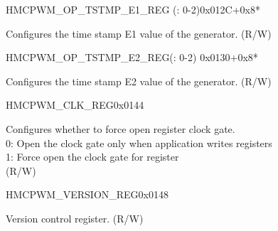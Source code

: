 \begin{register}{H}{MCPWM\_OP\_TSTMP\_E1\_REG (: 0-2)}{0x012C+0x8*}\label{regdesc:MCPWMOPNTSTMPE1REG}
%
%
\regnewline%
\begin{regdesc}\begin{reglist}
\label{fielddesc:MCPWMOPNTSTMPE1}\item [MCPWM\_OP\regindex{n}\_TSTMP\_E1] Configures the time stamp E1 value of the generator. (R/W)
\end{reglist}\end{regdesc}
\end{register}


\begin{register}{H}{MCPWM\_OP\_TSTMP\_E2\_REG(: 0-2)}
{0x0130+0x8*}\label{regdesc:MCPWMOPNTSTMPE2REG}
%
%
\regnewline%
\begin{regdesc}\begin{reglist}
\label{fielddesc:MCPWMOPNTSTMPE2}\item [MCPWM\_OP\regindex{n}\_TSTMP\_E2] Configures the time stamp E2 value of the generator. (R/W)
\end{reglist}\end{regdesc}
\end{register}


\begin{register}{H}{MCPWM\_CLK\_REG}{0x0144}\label{regdesc:MCPWMCLKREG}
%
%
\regnewline%
\begin{regdesc}\begin{reglist}
\label{fielddesc:MCPWMCLKEN}\item [MCPWM\_CLK\_EN] Configures whether to force open register clock gate.\\0: Open the clock gate only when application writes registers\\1: Force open the clock gate for register \\(R/W)
\end{reglist}\end{regdesc}
\end{register}


\begin{register}{H}{MCPWM\_VERSION\_REG}{0x0148}\label{regdesc:MCPWMVERSIONREG}
%
%
\regnewline%
\begin{regdesc}\begin{reglist}
\label{fielddesc:MCPWMDATE}\item [MCPWM\_DATE] Version control register. (R/W)
\end{reglist}\end{regdesc}
\end{register}

